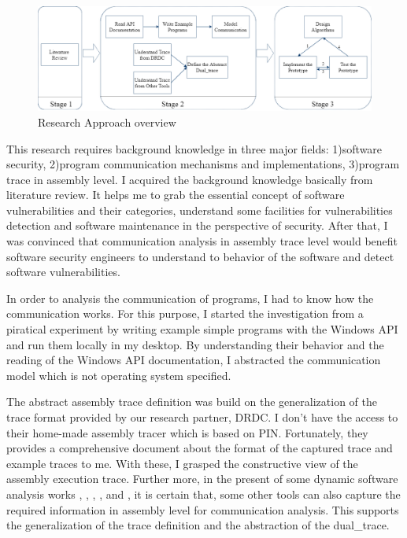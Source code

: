 \begin{figure}[H]
  \centerline{\includegraphics[scale=0.45]{Figures/methodology}}
  \caption{Research Approach overview}
  \label{methodology}
  \end{figure}

This research requires background knowledge in three major fields: 1)software security, 2)program communication mechanisms and implementations, 3)program trace in assembly level. I acquired the background knowledge basically from literature review. It helps me to grab the essential concept of software vulnerabilities and their categories, understand some facilities for vulnerabilities detection and software maintenance in the perspective of security. After that, I was convinced that communication analysis in assembly trace level would benefit software security engineers to understand to behavior of the software and detect software vulnerabilities. 

In order to analysis the communication of programs, I had to know how the communication works. For this purpose, I started the investigation from a piratical experiment by writing example simple programs with the Windows API and run them locally in my desktop. By understanding their behavior and the reading of the Windows API documentation, I abstracted the communication model which is not operating system specified.

The abstract assembly trace definition was build on the generalization of the trace format provided by our research partner, DRDC. I don't have the access to their home-made assembly tracer which is based on PIN\cite{_pin_????}. Fortunately, they provides a comprehensive document about the format of the captured trace and example traces to me. With these, I grasped the constructive view of the assembly execution trace. Further more, in the present of some dynamic software analysis works \cite{godefroid2008automated}, \cite{li2013software}, \cite{sailer2016coretana}, \cite{balakrishnan2004analyzing}, \cite{bhansali2006framework} and \cite{trumper2012maintenance}, it is certain that, some other tools can also capture the required information in assembly level for communication analysis. This supports the generalization of the trace definition and the abstraction of the dual\_trace.

